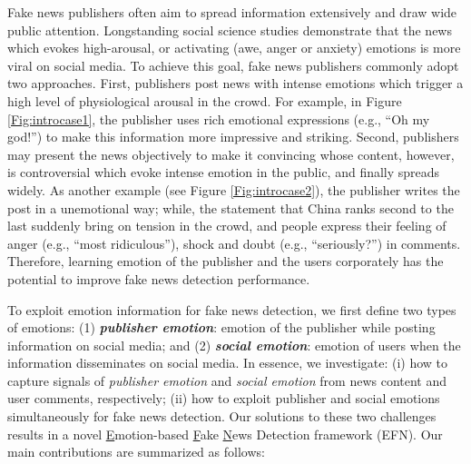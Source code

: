 \documentclass{article}
\newcommand{\m}{EFN}
\begin{document}
	Fake news publishers often aim to spread information extensively and draw wide public attention. Longstanding social science studies demonstrate that the news which evokes high-arousal, or activating (awe, anger or anxiety) emotions is more viral on social media\cite{stieglitz2013emotions,ferrara2015quantifying}.  To achieve this goal, fake news publishers commonly adopt two approaches. First, publishers post news with intense emotions which trigger a high level of physiological arousal in the crowd. For example, in Figure \ref{Fig:introcase1}, the publisher uses rich emotional expressions (e.g., ``Oh my god!'') to make this information more impressive and striking. Second, publishers may present the news objectively to make it convincing whose content, however, is controversial which evoke intense emotion in the public, and finally spreads widely. As another example (see Figure \ref{Fig:introcase2}), the publisher writes the post in a unemotional way; while, the statement that China ranks second to the last suddenly bring on tension in the crowd, and people express their feeling of anger (e.g., ``most ridiculous''), shock and doubt (e.g., ``seriously?'') in comments.
	Therefore, learning emotion of the publisher and the users corporately has the potential to improve fake news detection performance.
	
	To exploit emotion information for fake news detection, we first define two types of emotions: (1) \textbf{{\em publisher emotion}}: emotion of the publisher while posting information on social media; and (2) \textbf{{\em social emotion}}: emotion of users when the information disseminates on social media. 
	In essence, we investigate: (i) how to capture signals of {\em publisher emotion} and {\em social emotion} from news content and user comments, respectively; (ii) how to exploit publisher and social emotions simultaneously for fake news detection. Our solutions to these two challenges results in a novel \underline{E}motion-based \underline{F}ake \underline{N}ews Detection framework ({\m}). Our main contributions are summarized as follows:
	
\end{document}
